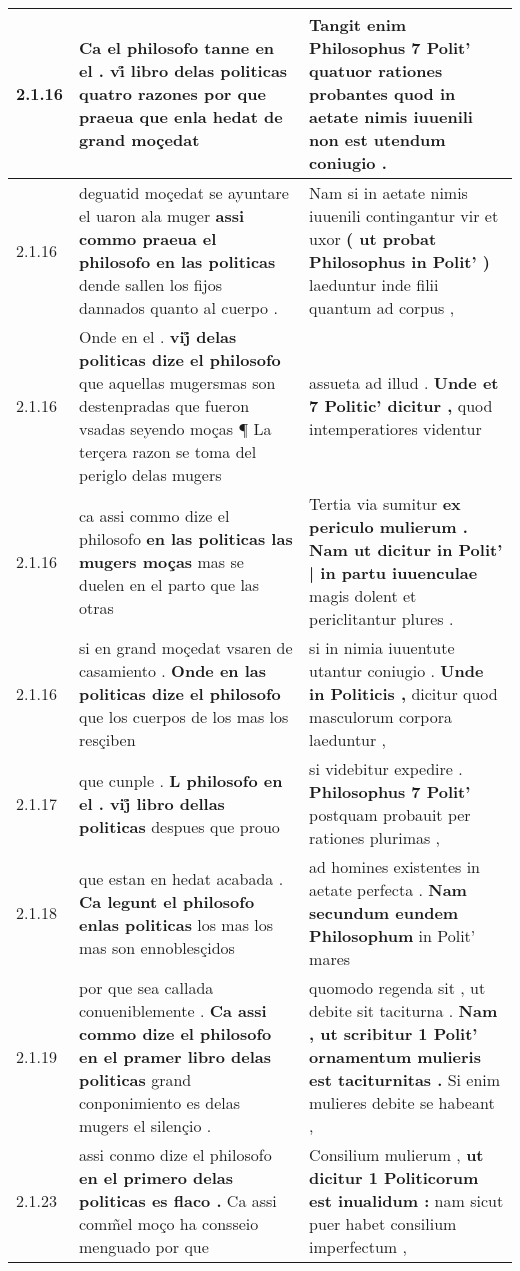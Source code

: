 \begin{tabular}{|p{1cm}|p{6.5cm}|p{6.5cm}|}
2.1.16 & Ca el philosofo tanne en el . \textbf{ vi̊ libro delas politicas quatro razones } por que praeua que enla hedat de grand moçedat & Tangit enim Philosophus 7 Polit’ \textbf{ quatuor rationes probantes } quod in aetate nimis iuuenili non est utendum coniugio . \\\hline
2.1.16 & deguatid moçedat se ayuntare el uaron ala muger \textbf{ assi commo praeua el philosofo en las politicas } dende sallen los fijos dannados quanto al cuerpo . & Nam si in aetate nimis iuuenili contingantur vir et uxor \textbf{ ( ut probat Philosophus in Polit’ ) } laeduntur inde filii quantum ad corpus , \\\hline
2.1.16 & Onde en el . \textbf{ vij̊ delas politicas dize el philosofo } que aquellas mugersmas son destenpradas que fueron vsadas seyendo moças ¶ La terçera razon se toma del periglo delas mugers & assueta ad illud . \textbf{ Unde et 7 Politic’ dicitur , } quod intemperatiores videntur \\\hline
2.1.16 & ca assi commo dize el philosofo \textbf{ en las politicas las mugers moças } mas se duelen en el parto que las otras & Tertia via sumitur \textbf{ ex periculo mulierum . Nam ut dicitur in Polit’ | in partu iuuenculae } magis dolent et periclitantur plures . \\\hline
2.1.16 & si en grand moçedat vsaren de casamiento . \textbf{ Onde en las politicas dize el philosofo } que los cuerpos de los mas los resçiben & si in nimia iuuentute utantur coniugio . \textbf{ Unde in Politicis , } dicitur quod masculorum corpora laeduntur , \\\hline
2.1.17 & que cunple . \textbf{ L philosofo en el . vij̊ libro dellas politicas } despues que prouo & si videbitur expedire . \textbf{ Philosophus 7 Polit’ } postquam probauit per rationes plurimas , \\\hline
2.1.18 & que estan en hedat acabada . \textbf{ Ca legunt el philosofo enlas politicas } los mas los mas son ennoblesçidos & ad homines existentes in aetate perfecta . \textbf{ Nam secundum eundem Philosophum } in Polit’ mares \\\hline
2.1.19 & por que sea callada conueniblemente . \textbf{ Ca assi commo dize el philosofo en el pramer libro delas politicas } grand conponimiento es delas mugers el silençio . & quomodo regenda sit , ut debite sit taciturna . \textbf{ Nam , ut scribitur 1 Polit’ ornamentum mulieris est taciturnitas . } Si enim mulieres debite se habeant , \\\hline
2.1.23 & assi conmo dize el philosofo \textbf{ en el primero delas politicas es flaco . } Ca assi comm̃el moço ha consseio menguado por que & Consilium mulierum , \textbf{ ut dicitur 1 Politicorum est inualidum : } nam sicut puer habet consilium imperfectum , \\\hline

\end{tabular}
